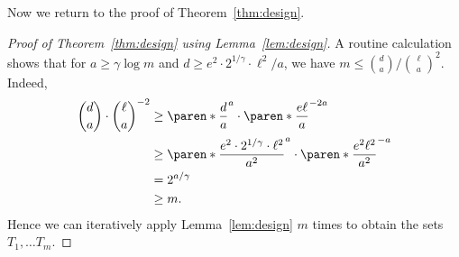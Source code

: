 Now we return to the proof of Theorem~\ref{thm:design}.

\begin{proof}[Proof of Theorem~\ref{thm:design} using Lemma~\ref{lem:design}]
  A routine calculation shows that for $a \ge \gamma \log{m}$ and $d \ge e^2
  \cdot 2^{1/\gamma} \cdot \ell^2/a$, we have $m \le \binom{d}{a} /
  \binom{\ell}{a}^2$. Indeed,
  \begin{align*}
    \binom{d}{a} \cdot \binom{\ell}{a}^{-2}
    &\ge \paren*{\frac{d}{a}}^a \cdot \paren*{\frac{e \ell}{a}}^{-2a}\\
    &\ge \paren*{\frac{e^2 \cdot 2^{1/\gamma} \cdot \ell^2}{a^2}}^{a} \cdot \paren*{\frac{e^2 \ell^2}{a^2}}^{-a}\\
    &= 2^{a / \gamma}\\
    &\ge m.
  \end{align*}
  Hence we can iteratively apply Lemma~\ref{lem:design} $m$ times to obtain the
  sets $T_1, \dots T_m$.
\end{proof}
